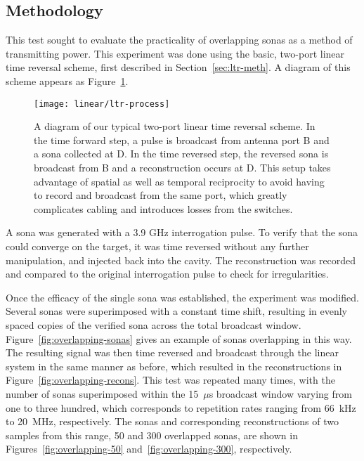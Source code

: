 \subsection{Methodology}

This test sought to evaluate the practicality of overlapping sonas as a method of transmitting power. This experiment was done using the basic, two-port linear time reversal scheme, first described in Section~\ref{sec:ltr-meth}. A diagram of this scheme appears as Figure~\ref{fig:ltr-process}.

\begin{figure}[h!]
\centering
\texttt{[image: linear/ltr-process]}
    \caption[Two-Port Linear Time Reversal Setup]{A diagram of our typical two-port linear time reversal scheme. In the time forward step, a pulse is broadcast from antenna port B and a sona collected at D. In the time reversed step, the reversed sona is broadcast from B and a reconstruction occurs at D. This setup takes advantage of spatial as well as temporal reciprocity to avoid having to record and broadcast from the same port, which greatly complicates cabling and introduces losses from the switches.}
    \label{fig:ltr-process}
\end{figure}

A sona was generated with a 3.9 GHz interrogation pulse. To verify that the sona could converge on the target, it was time reversed without any further manipulation, and injected back into the cavity. The reconstruction was recorded and compared to the original interrogation pulse to check for irregularities.

Once the efficacy of the single sona was established, the experiment was modified. Several sonas were superimposed with a constant time shift, resulting in evenly spaced copies of the verified sona across the total broadcast window. Figure~\ref{fig:overlapping-sonas} gives an example of sonas overlapping in this way. The resulting signal was then time reversed and broadcast through the linear system in the same manner as before, which resulted in the reconstructions in Figure~\ref{fig:overlapping-recons}. This test was repeated many times, with the number of sonas superimposed within the 15~$\mu$s broadcast window varying from one to three hundred, which corresponds to repetition rates ranging from 66~kHz to 20~MHz, respectively. The sonas and corresponding reconstructions of two samples from this range, 50 and 300 overlapped sonas, are shown in Figures~\ref{fig:overlapping-50} and~\ref{fig:overlapping-300}, respectively.

